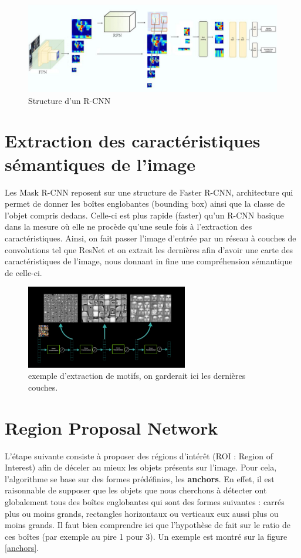 \begin{figure}[!h]
\centering
\includegraphics[width=300pts]{images/Mask_R_CNN/R_CNN_structure.png} 
\caption{Structure d'un R-CNN}
\label{R_CNN_structure}
\end{figure}



\section{Extraction des caractéristiques sémantiques de l'image}

Les Mask R-CNN reposent sur une structure de Faster R-CNN, architecture qui permet de donner les boîtes englobantes (bounding box) ainsi que la classe de l'objet compris dedans. Celle-ci est plus rapide (faster) qu'un R-CNN basique dans la mesure où elle ne procède qu'une seule fois à l'extraction des caractéristiques. Ainsi, on fait passer l'image d'entrée par un réseau à couches de convolutions tel que ResNet et on extrait les dernières afin d'avoir une carte des caractéristiques de l'image, nous donnant in fine une compréhension sémantique de celle-ci.

\begin{figure}[!h]
\centering
\includegraphics[width=200pt]{images/Mask_R_CNN/resnet_extraction.png} 
\caption{exemple d'extraction de motifs, on garderait ici les dernières couches.}
\label{resnet_extraction}
\end{figure}

\section{Region Proposal Network}

L'étape suivante consiste à proposer des régions d'intérêt (ROI : Region of Interest) afin de déceler au mieux les objets présents sur l'image. Pour cela, l'algorithme se base sur des formes prédéfinies, les \textbf{anchors}. En effet, il est raisonnable de supposer que les objets que nous cherchons à détecter ont globalement tous des boîtes englobantes qui sont des formes suivantes : carrés plus ou moins grands, rectangles horizontaux ou verticaux eux aussi plus ou moins grands. Il faut bien comprendre ici que l'hypothèse de fait sur le ratio de ces boîtes (par exemple au pire 1 pour 3). Un exemple est montré sur la figure \ref{anchors}.

